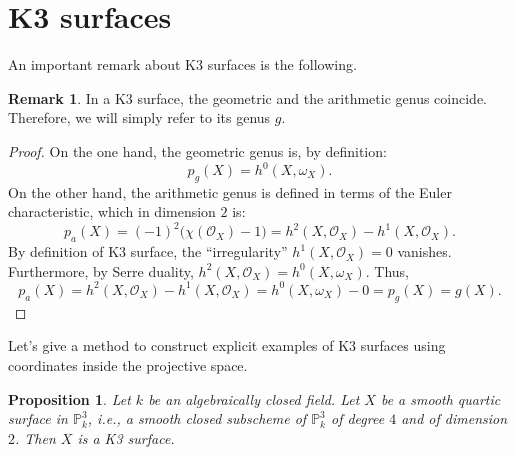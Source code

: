 \documentclass{report}
\newtheorem{proposition}[theorem]{Proposition}
\theoremstyle{definition}
\newtheorem{remark}[theorem]{Remark}
\begin{document}
\section{K3 surfaces}

An important remark about K3 surfaces is the following.

\begin{remark}
In a K3 surface, the geometric and the arithmetic genus coincide. Therefore, we will simply refer to its genus $g$.
\end{remark}

\begin{proof}
On the one hand, the geometric genus is, by definition:
\[p_g(X)=h^0(X,\omega_X).\]
On the other hand, the arithmetic genus is defined in terms of the Euler characteristic, which in dimension $2$ is:
\[p_a(X)=(-1)^2\big(\chi(\mathcal{O}_X)-1\big)=h^2(X,\mathcal{O}_X)-h^1(X,\mathcal{O}_X).\]
By definition of K3 surface, the ``irregularity'' $h^1(X,\mathcal{O}_X)=0$ vanishes. Furthermore, by Serre duality, $h^2(X,\mathcal{O}_X)=h^0(X,\omega_X)$. Thus,
\[p_a(X)=h^2(X,\mathcal{O}_X)-h^1(X,\mathcal{O}_X)=h^0(X,\omega_X)-0=p_g(X)=g(X).\]
\end{proof}

Let's give a method \cite[Example~2.2]{liedtke2016lectures} to construct explicit examples of K3 surfaces using coordinates inside the projective space.

\begin{proposition}
Let $k$ be an algebraically closed field. Let $X$ be a smooth quartic surface in $\mathbb{P}_k^3$, i.e., a smooth closed subscheme of $\mathbb{P}_k^3$ of degree $4$ and of dimension $2$. Then $X$ is a K3 surface.
\end{proposition}
\end{document}
